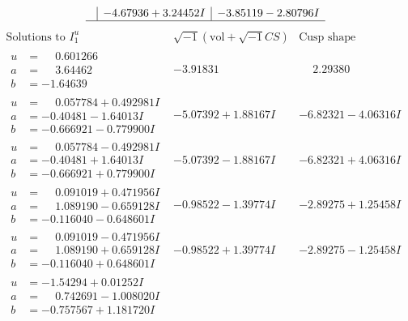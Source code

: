 \documentclass[1p]{elsarticle_modified}
\theoremstyle{definition}
\newcommand{\I}{\sqrt{-1}}
\begin{document}
$$\begin{array}{c|c|c}
 & -4.67936 + 3.24452 I & -3.85119 - 2.80796 I\\
 \hline 
 \end{array}$$\newpage$$\begin{array}{c|c|c}  
\text{Solutions to }I^u_{1}& \I (\text{vol} + \sqrt{-1}CS) & \text{Cusp shape}\\
 \hline 
\begin{aligned}
u &= \phantom{-}0.601266\phantom{ +0.000000I} \\
a &= \phantom{-}3.64462\phantom{ +0.000000I} \\
b &= -1.64639\phantom{ +0.000000I}\end{aligned}
 & -3.91831\phantom{ +0.000000I} & \phantom{-}2.29380\phantom{ +0.000000I} \\ \hline\begin{aligned}
u &= \phantom{-}0.057784 + 0.492981 I \\
a &= -0.40481 - 1.64013 I \\
b &= -0.666921 - 0.779900 I\end{aligned}
 & -5.07392 + 1.88167 I & -6.82321 - 4.06316 I \\ \hline\begin{aligned}
u &= \phantom{-}0.057784 - 0.492981 I \\
a &= -0.40481 + 1.64013 I \\
b &= -0.666921 + 0.779900 I\end{aligned}
 & -5.07392 - 1.88167 I & -6.82321 + 4.06316 I \\ \hline\begin{aligned}
u &= \phantom{-}0.091019 + 0.471956 I \\
a &= \phantom{-}1.089190 - 0.659128 I \\
b &= -0.116040 - 0.648601 I\end{aligned}
 & -0.98522 - 1.39774 I & -2.89275 + 1.25458 I \\ \hline\begin{aligned}
u &= \phantom{-}0.091019 - 0.471956 I \\
a &= \phantom{-}1.089190 + 0.659128 I \\
b &= -0.116040 + 0.648601 I\end{aligned}
 & -0.98522 + 1.39774 I & -2.89275 - 1.25458 I \\ \hline\begin{aligned}
u &= -1.54294 + 0.01252 I \\
a &= \phantom{-}0.742691 - 1.008020 I \\
b &= -0.757567 + 1.181720 I\end{aligned}

\end{array}$$
\end{document}
